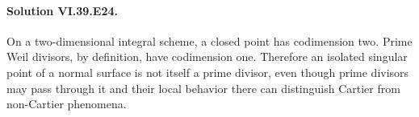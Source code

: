 \paragraph{Solution VI.39.E24.}\label{sol:vi39-e24}
On a two-dimensional integral scheme, a closed point has codimension two.  Prime Weil divisors, by definition, have codimension one.  Therefore an isolated singular point of a normal surface is not itself a prime divisor, even though prime divisors may pass through it and their local behavior there can distinguish Cartier from non-Cartier phenomena.
